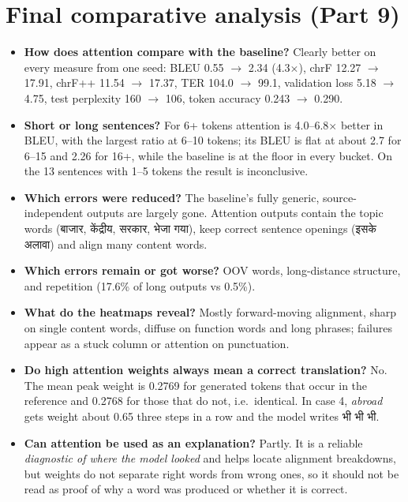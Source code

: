 \documentclass[10pt,a4paper]{article}
\DeclareRobustCommand{\hi}[1]{{\hindifont #1}}
\begin{document}
\section{Final comparative analysis (Part 9)}
\begin{itemize}
\item \textbf{How does attention compare with the baseline?} Clearly better on every measure from one seed: BLEU 0.55 $\rightarrow$ 2.34 (4.3$\times$), chrF 12.27 $\rightarrow$ 17.91,
chrF++ 11.54 $\rightarrow$ 17.37, TER 104.0 $\rightarrow$ 99.1, validation loss 5.18 $\rightarrow$ 4.75, test perplexity 160 $\rightarrow$ 106, token accuracy 0.243 $\rightarrow$ 0.290.
\item \textbf{Short or long sentences?} For 6+ tokens attention is 4.0--6.8$\times$ better in BLEU, with the largest ratio at 6--10 tokens; its BLEU is
flat at about 2.7 for 6--15 and 2.26 for 16+, while the baseline is at the floor in every bucket. On the 13 sentences with 1--5 tokens the result is inconclusive.
\item \textbf{Which errors were reduced?} The baseline's fully generic, source-independent outputs are largely gone. Attention outputs contain the topic
words (\hi{बाजार}, \hi{केंद्रीय}, \hi{सरकार}, \hi{भेजा गया}), keep correct sentence openings (\hi{इसके अलावा}) and align many content words.
\item \textbf{Which errors remain or got worse?} OOV words, long-distance structure, and repetition (17.6\% of long outputs vs 0.5\%).
\item \textbf{What do the heatmaps reveal?} Mostly forward-moving alignment, sharp on single content words, diffuse on function words and long phrases;
failures appear as a stuck column or attention on punctuation.
\item \textbf{Do high attention weights always mean a correct translation?} No. The mean peak weight is 0.2769 for generated tokens that occur in
the reference and 0.2768 for those that do not, i.e.\ identical. In case 4, \emph{abroad} gets weight about 0.65 three steps in a row and the model writes
\hi{भी भी भी}.
\item \textbf{Can attention be used as an explanation?} Partly. It is a reliable \emph{diagnostic of where the model looked} and helps locate
alignment breakdowns, but weights do not separate right words from wrong ones, so it should not be read as proof of why a word was produced or whether it is correct.
\end{itemize}
\end{document}

